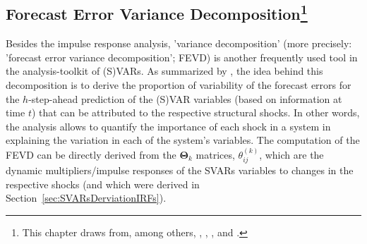 \documentclass[a4paper,11pt,listof=nochaptergap,oneside,pointednumbers,bibtotoc,bigheadings,liststotoc,hidelinks]{scrbook}
\theoremstyle{mysatz}
\theoremstyle{mydefinition}
\theoremstyle{mytheorem}
\theoremstyle{mybemerkung}
\newcommand{\vect}[1]{\boldsymbol{\mathbf{#1}}}
\begin{document}
\subsection[Forecast Error Variance Decomposition]{Forecast Error Variance Decomposition\footnote{This chapter draws from, among others, \citet{lutkepohl:10}, \citet{lutkepohl:05}, \citet{lutkepohlkilian:17}, \citet{zivot:00} and \citet{sims:11}.}}
\label{sec:FEVDTheory}
Besides the impulse response analysis, 'variance decomposition' (more precisely: 'forecast error variance decomposition'; FEVD) is another frequently used tool in the analysis-toolkit of (S)VARs. As summarized by \citet{zivot:00}, the idea behind this decomposition is to derive the proportion of variability of the forecast errors for the $h$-step-ahead prediction of the (S)VAR variables (based on information at time $t$) that can be attributed to the respective structural shocks. In other words, the analysis allows to quantify the importance of each shock in a system in explaining the variation in each of the system's variables.  The computation of the FEVD can be directly derived from the $\vect{\Theta}_k$ matrices, $\theta_{ij}^{(k)}$, which are the dynamic multipliers/impulse responses of the SVARs variables to changes in the respective shocks (and which were derived in Section~\ref{sec:SVARsDerviationIRFs}).
\end{document}
